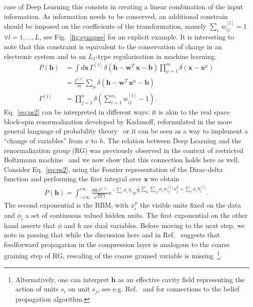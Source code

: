 \documentclass[5p]{elsarticle}
\begin{document}
	case of Deep Learning this consists in creating a linear combination of the input information. As information needs to be conserved, an additional constrain should be imposed on the coefficients of the transformation, namely $\sum_i \, w_{ij}^{[l]} =1$ $\forall l = 1, ..., L$, see Fig.~\eqref{fig:synapse} for an explicit example. It is interesting to note that this constraint is equivalent to the conservation of charge in an electronic system and to an $L_1$-type regularisation in machine learning.
%
\begin{align} \label{eq:ps2}
P(\mathbf{h}) &= \int {d\mathbf{x}} \, \Gamma^{[1]} \, \delta\left( \mathbf{h} -  \mathbf{w}^{T} \, \mathbf{x} - \mathbf{b} \right) \prod_{\mu =1}^m  \delta ( \mathbf{x} - \mathbf{x}^{\mu} )  \\ \nonumber
&= \frac{\Gamma^{[1]}}{m} \sum_{\mu}  \delta \left( \mathbf{h} -  \mathbf{w}^{T} \, \mathbf{x}^{\mu} - \mathbf{b} \right) \\
\Gamma^{[1]} &= \prod_{j=1}^n \delta\left( \sum_{i=1}^{n_1} w_{ij}^{[1]} -1 \right) .
\end{align}
%
Eq.~\eqref{eq:ps2} can be interpreted in different ways: it is akin to the real space block-spin renormalization developed by Kadanoff, reformulated in the more general language of probability theory~\cite{roberto, ma, cassandro} or it can be seen as a way to implement a ``change of variables'' from $x$ to $h$. The relation between Deep Learning and the renormalization group (RG) was previously observed in the context of restricted Boltzmann machine~\cite{mehta} and we now show that this connection holds here as well. Consider Eq.~\eqref{eq:ps2}, using the Fourier representation of the Dirac-delta function and performing the first integral over $\mathbf{x}$ we obtain
%
\begin{align} \label{eq:rbm}
P(\mathbf{h}) =\int_{-i \infty}^{i \infty} \frac{d\boldsymbol{\phi}  \,  \Gamma^{[1]} }{\sqrt{2\pi \, i}} e^{-\sum_{i} \phi_i \, h_i } e^{\frac{1}{m} \sum_{\mu} \sum_{ij} \phi_i \, w_{ij}^{[1]} x_{j}^{\mu} +\sum_i \phi_i \, b_i ^{[1]}  }.
\end{align}
The second exponential is the RBM, with $x_i^{\mu}$ the visible units fixed on the data and $\phi_i$ a set of continuous valued  hidden units. The first exponential on the other hand asserts that $\phi$ and $h$ are dual variables. Before moving to the next step, we note in passing that while the discussion here and in Ref.~ \cite{mehta} suggests that feedforward propagation in the compression layer is analogous to the coarse graining step of RG, rescaling of the coarse grained variable is missing~\footnote{Alternatively, one can interpret $\mathbf{h}$ as an effective cavity field representing the action of units $s_i$ on unit $s_j$, see e.g. Ref.~\cite{parisi1} and \cite{opper} for connections to the belief propagation algorithm. }.
\end{document}
